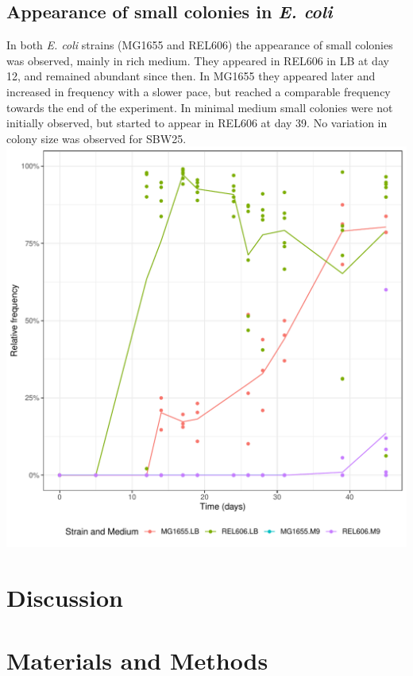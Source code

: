 \documentclass[
	11pt,
	a4paper,
]{article} %
\begin{document}
\begin{multicols}{2}
\subsection*{Appearance of small colonies in \textit{E. coli}}
In both \textit{E. coli} strains (MG1655 and REL606) the appearance of small colonies was observed, mainly in rich medium.
They appeared in REL606 in LB at day 12, and remained abundant since then.
In MG1655 they appeared later and increased in frequency with a slower pace, but reached a comparable frequency towards the end of the experiment.
In minimal medium small colonies were not initially observed, but started to appear in REL606 at day 39.
No variation in colony size was observed for SBW25.
\\[2ex]
\includegraphics[width=\columnwidth]{small_plot_report.pdf}
\vspace{2ex}

\section*{Discussion}

\section*{Materials and Methods}


\end{multicols}
\end{document}
